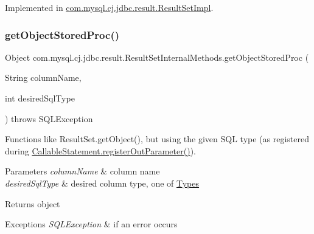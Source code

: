 Implemented in \mbox{\hyperlink{classcom_1_1mysql_1_1cj_1_1jdbc_1_1result_1_1_result_set_impl_a70dfce90a5b666ec4699ca1b91a7a713}{com.\+mysql.\+cj.\+jdbc.\+result.\+Result\+Set\+Impl}}.

\mbox{\label{interfacecom_1_1mysql_1_1cj_1_1jdbc_1_1result_1_1_result_set_internal_methods_a403c7181f28d44398e8ba4865edf8fb0}} 
\subsubsection{\texorpdfstring{get\+Object\+Stored\+Proc()}{getObjectStoredProc()}\hspace{0.1cm}{\footnotesize\ttfamily [3/4]}}
{\footnotesize\ttfamily Object com.\+mysql.\+cj.\+jdbc.\+result.\+Result\+Set\+Internal\+Methods.\+get\+Object\+Stored\+Proc (\begin{DoxyParamCaption}\item[{String}]{column\+Name,  }\item[{int}]{desired\+Sql\+Type }\end{DoxyParamCaption}) throws S\+Q\+L\+Exception}

Functions like Result\+Set.\+get\+Object(), but using the given S\+QL type (as registered during \mbox{\hyperlink{classcom_1_1mysql_1_1cj_1_1jdbc_1_1_callable_statement_affc71b6220a237feb94f842a2347d1da}{Callable\+Statement.\+register\+Out\+Parameter()}}).


\begin{DoxyParams}{Parameters}
{\em column\+Name} & column name \\
\hline
{\em desired\+Sql\+Type} & desired column type, one of \mbox{\hyperlink{}{Types}} \\
\hline
\end{DoxyParams}
\begin{DoxyReturn}{Returns}
object 
\end{DoxyReturn}

\begin{DoxyExceptions}{Exceptions}
{\em S\+Q\+L\+Exception} & if an error occurs \\
\hline
\end{DoxyExceptions}


